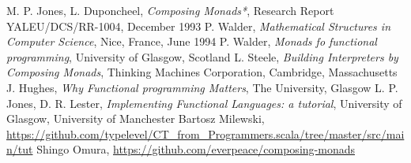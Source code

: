 \begin{thebibliography}{99}
   M. P. Jones, L. Duponcheel, \emph{Composing Monads*}, Research Report YALEU/DCS/RR-1004, December 1993
   P. Walder, \emph{Mathematical Structures in Computer Science}, Nice, France, June 1994
   P. Walder, \emph{Monads fo functional programming}, University of Glasgow, Scotland
   L. Steele, \emph{Building Interpreters by Composing Monads}, Thinking Machines Corporation, Cambridge, Massachusetts
   J. Hughes, \emph{Why Functional programming Matters}, The University, Glasgow
   L. P. Jones, D. R. Lester, \emph{Implementing Functional Languages: a tutorial}, University of Glasgow, University of Manchester
   Bartosz Milewski, \url{https://github.com/typelevel/CT_from_Programmers.scala/tree/master/src/main/tut}
   Shingo Omura, \url{https://github.com/everpeace/composing-monads}
\end{thebibliography}